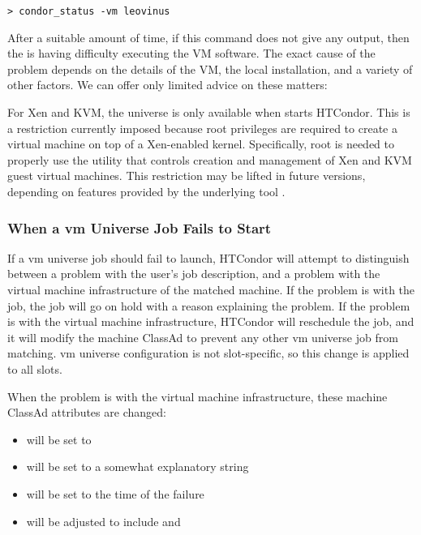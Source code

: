 \begin{verbatim}
> condor_status -vm leovinus
\end{verbatim}

After a suitable amount of time, if this command does not give any output,
then the  is having difficulty executing the VM software.
The exact cause of the problem depends on the details of the VM, the local 
installation, and a variety of other factors. We can offer only limited 
advice on these matters:

For Xen and KVM,
the  universe is only available when  starts HTCondor.
This is a restriction currently imposed because root privileges are 
required to create a virtual machine on top of a Xen-enabled kernel.
Specifically, root is needed 
to properly use the  utility that controls 
creation and management of Xen and KVM guest virtual machines.
This restriction may be lifted in future versions,
depending on features provided by the underlying tool .

\subsubsection{When a vm Universe Job Fails to Start}

If a vm universe job should fail to launch, 
HTCondor will attempt to distinguish
between a problem with the user's job description,
and a problem with the virtual machine infrastructure of the 
matched machine.  
If the problem is with the job, 
the job will go on hold with a reason explaining the problem.  
If the problem is with the virtual machine infrastructure,
HTCondor will reschedule the job, and it will modify the machine ClassAd
to prevent any other vm universe job from matching.
vm universe configuration is not slot-specific, 
so this change is applied to all slots.

When the problem is with the virtual machine infrastructure,
these machine ClassAd attributes are changed:
\begin{itemize}
\item {} will be set to 
\item {} will be set to a somewhat explanatory string
\item {} will be set to the time of the failure 
\item {} will be adjusted to include  
and 
\end{itemize}

